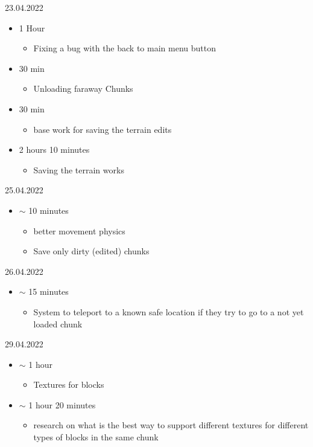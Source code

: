 \documentclass{article}
\begin{document}
23.04.2022
\begin{itemize}
	\item 1 Hour
	\begin{itemize}
		\item Fixing a bug with the back to main menu button
	\end{itemize}
\item 30 min
\begin{itemize}
	\item Unloading faraway Chunks
\end{itemize}
\item 30 min
\begin{itemize}
	\item base work for saving the terrain edits
\end{itemize}
\item 2 hours 10 minutes
\begin{itemize}
	\item Saving the terrain works
\end{itemize}
\end{itemize}

25.04.2022
\begin{itemize}
	\item $\sim$ 10 minutes
	\begin{itemize}
		\item better movement physics
		\item Save only dirty (edited) chunks
	\end{itemize}
\end{itemize}

26.04.2022
\begin{itemize}
	\item $\sim$ 15 minutes
	\begin{itemize}
		\item System to teleport to a known safe location if they try to go to a not yet loaded chunk
	\end{itemize}
\end{itemize}

29.04.2022
\begin{itemize}
	\item $\sim$ 1 hour
	\begin{itemize}
		\item Textures for blocks
	\end{itemize}
\item $\sim$ 1 hour 20 minutes
\begin{itemize}
	\item research on what is the best way to support different textures for different types of blocks in the same chunk
\end{itemize}
\end{itemize}
\end{document}

